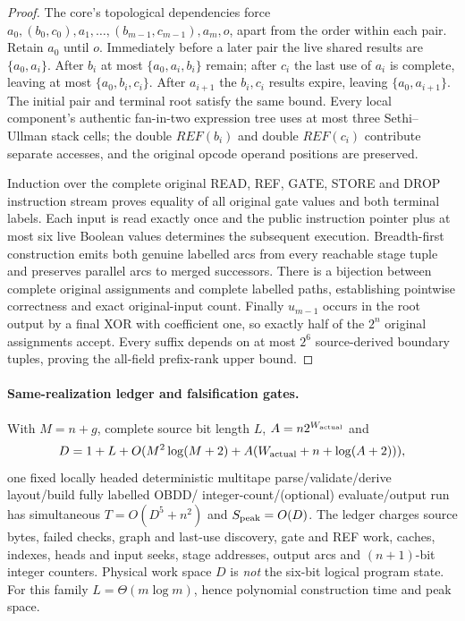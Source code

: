 \documentclass[11pt]{article}
\begin{document}
\begin{proof}
The core's topological dependencies force
$a_0,(b_0,c_0),a_1,\ldots,(b_{m-1},c_{m-1}),a_m,o$,
apart from the order within each pair.
Retain $a_0$ until $o$.
Immediately before a later pair the live shared results are
$\{a_0,a_i\}$. After $b_i$ at most
$\{a_0,a_i,b_i\}$ remain; after $c_i$ the last use of
$a_i$ is complete, leaving at most $\{a_0,b_i,c_i\}$.
After $a_{i+1}$ the $b_i,c_i$ results expire,
leaving $\{a_0,a_{i+1}\}$. The initial pair and
terminal root satisfy the same bound.
Every local component's authentic fan-in-two expression tree
uses at most three Sethi--Ullman stack cells; the double
$REF(b_i)$ and double $REF(c_i)$ contribute separate accesses,
and the original opcode operand positions are preserved.

Induction over the complete original READ, REF, GATE,
STORE and DROP instruction stream proves equality of all original
gate values and both terminal labels. Each input is read exactly
once and the public instruction pointer plus at most six
live Boolean values determines the subsequent execution.
Breadth-first construction emits both genuine labelled
arcs from every reachable stage tuple and preserves parallel
arcs to merged successors. There is a bijection between complete
original assignments and complete labelled paths, establishing
pointwise correctness and exact original-input count.
Finally $u_{m-1}$ occurs in the root output by a final
XOR with coefficient one, so exactly half of the $2^n$
original assignments accept. Every suffix depends on at
most $2^6$ source-derived boundary tuples, proving the
all-field prefix-rank upper bound.
\end{proof}

\paragraph{Same-realization ledger and falsification gates.}
With $M=n+g$, complete source bit length $L$,
$A=n2^{W_{\rm actual}}$ and
\[
 D=1+L+O(M^2\log(M+2)+A(W_{\rm actual}+n+
 \log(A+2))),
\]
one fixed locally headed deterministic multitape
parse/validate/derive layout/build fully labelled OBDD/
integer-count/(optional) evaluate/output run has simultaneous
$T=O(D^5+n^2)$ and $S_{\rm peak}=O(D)$.
The ledger charges source bytes, failed checks, graph and
last-use discovery, gate and REF work, caches, indexes,
heads and input seeks, stage addresses, output arcs and
$(n+1)$-bit integer counters. Physical work space $D$
is \emph{not} the six-bit logical program state.
For this family $L=\Theta(m\log m)$, hence polynomial
construction time and peak space.
\end{document}
